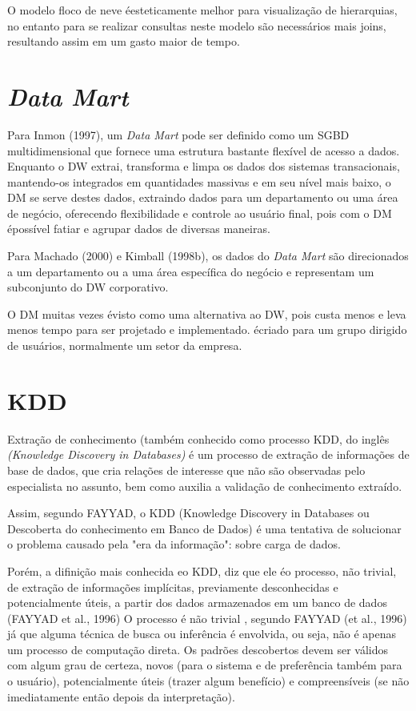 O modelo floco de neve \'{e}esteticamente melhor para visualiza\c{c}\~{a}o de hierarquias, no entanto para se realizar consultas neste modelo s\~{a}o necess\'{a}rios mais joins, resultando assim em um gasto maior de tempo.
	
\section{\textit{Data Mart}}

Para Inmon (1997), um \textit{Data Mart} pode ser definido como um SGBD multidimensional que fornece uma estrutura bastante flex\'{i}vel de acesso a dados. Enquanto o DW extrai, transforma e limpa os dados dos sistemas transacionais, mantendo-os integrados em quantidades massivas e em seu n\'{i}vel mais baixo, o DM se serve destes dados, extraindo dados para um departamento ou uma \'{a}rea de neg\'{o}cio, oferecendo flexibilidade e controle ao usu\'{a}rio final, pois com o DM \'{e}poss\'{i}vel fatiar e agrupar dados de diversas maneiras.

Para Machado (2000) e Kimball (1998b), os dados do \textit{Data Mart} s\~{a}o direcionados a um departamento ou a uma \'{a}rea espec\'{i}fica do neg\'{o}cio e representam um subconjunto do DW corporativo.

O DM muitas vezes \'{e}visto como uma alternativa ao DW, pois custa menos e leva menos tempo para ser projetado e implementado. \'{e}criado para um grupo dirigido de usu\'{a}rios, normalmente um setor da empresa.

\section{KDD}

Extra\c{c}\~{a}o de conhecimento (tamb\'{e}m conhecido como processo KDD, do ingl\^{e}s 
\textit{(Knowledge Discovery in Databases)} \'{e} um processo de extra\c{c}\~{a}o de informa\c{c}\~{o}es de base de dados, que cria rela\c{c}\~{o}es de interesse que n\~{a}o s\~{a}o observadas pelo especialista no assunto, bem como auxilia a valida\c{c}\~{a}o de conhecimento extra\'{i}do.

Assim, segundo FAYYAD, o KDD (Knowledge Discovery in Databases ou Descoberta do conhecimento em Banco de Dados) \'{e} uma tentativa de solucionar o problema causado pela "era da informa\c{c}\~{a}o": sobre carga de dados.

Por\'{e}m, a difini\c{c}\~{a}o mais conhecida eo KDD, diz que ele \'{e}o processo, n\~{a}o trivial, de extra\c{c}\~{a}o de informa\c{c}\~{o}es impl\'{i}citas, previamente desconhecidas e potencialmente úteis, a partir dos dados armazenados em um banco de dados (FAYYAD et al., 1996)
O processo \'{e} n\~{a}o trivial , segundo FAYYAD (et al., 1996) j\'{a} que alguma t\'{e}cnica de busca ou infer\^{e}ncia \'{e} envolvida, ou seja, n\~{a}o \'{e} apenas um processo de computa\c{c}\~{a}o direta. Os padr\~{o}es descobertos devem ser v\'{a}lidos com algum grau de certeza, novos (para o sistema e de prefer\^{e}ncia tamb\'{e}m para o usu\'{a}rio), potencialmente úteis (trazer algum benef\'{i}cio) e compreens\'{i}veis (se n\~{a}o imediatamente ent\~{a}o depois da interpreta\c{c}\~{a}o).

